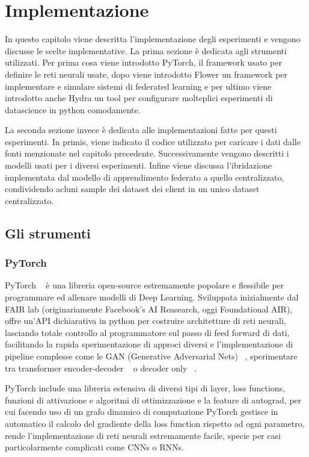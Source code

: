 \chapter{Implementazione}
In questo capitolo viene descritta l'implementazione degli esperimenti
e vengono discusse le scelte implementative.
La prima sezione è dedicata agli strumenti utilizzati. Per prima cosa
viene introdotto PyTorch, il framework usato per 
definire le reti neurali usate, dopo viene introdotto Flower un 
framework per implementare e simulare sistemi di federated learning e 
per ultimo viene introdotto anche Hydra un tool per configurare 
molteplici esperimenti di datascience in python comodamente.

La seconda sezione invece è dedicata alle implementazioni fatte per 
questi esperimenti. In primis, viene indicato il codice utilizzato per 
caricare i dati dalle fonti menzionate nel capitolo precedente.
Successivamente vengono descritti i modelli usati per
i diversi esperimenti. Infine viene discussa l'ibridazione 
implementata dal modello di 
apprendimento federato a quello centralizzato, condividendo acluni 
sample dei dataset dei client in un unico dataset centralizzato.


\section{Gli strumenti}
\subsection{PyTorch}
PyTorch ~\cite{pytorch} è una libreria open-source estremamente popolare e flessibile 
per programmare ed allenare modelli di Deep Learning.
Sviluppata inizialmente dal FAIR lab (originariamente Facebook's AI
Reasearch, oggi Foundational AIR), offre
un'API dichiarativa in python per costruire architetture di reti 
neurali, lasciando totale controllo al programmatore sul passo di 
feed forward di dati, facilitando la rapida sperimentazione di 
approci diversi e l'implementazione di pipeline
complesse come le GAN (Generative Adversarial Nets) ~\cite{goodfellow2014gan},
sperimentare tra transformer encoder-decoder ~\cite{vaswani2017trans}
o decoder only ~\cite{Radford2018ImprovingLU}.

PyTorch include una libreria estensiva di diversi tipi di layer,
loss functions, funzioni di attivazione e algoritmi di ottimizzazione
e la feature di autograd,
per cui facendo uso di un grafo dinamico di computazione PyTorch 
gestisce in automatico il calcolo del gradiente della loss function 
rispetto ad ogni parametro, rende l'implementazione di reti neurali 
estremamente facile, specie per casi particolarmente complicati 
come CNNs o RNNs.


